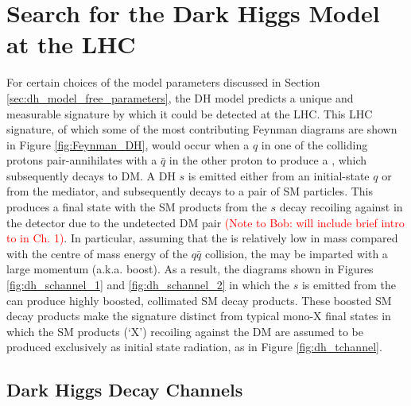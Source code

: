 \section{Search for the Dark Higgs Model at the LHC}
\label{sec:dh_search_lhc}

For certain choices of the model parameters discussed in Section \ref{sec:dh_model_free_parameters}, the DH model predicts a unique and measurable signature by which it could be detected at the LHC. This LHC signature, of which some of the most contributing Feynman diagrams are shown in Figure \ref{fig:Feynman_DH}, would occur when a \(q\) in one of the colliding protons pair-annihilates with a \(\bar{q}\) in the other proton to produce a \Zprime, which subsequently decays to DM. A DH \(s\) is emitted either from an initial-state \(q\) or from the \Zprime mediator, and subsequently decays to a pair of SM particles. This produces a final state with the SM products from the \(s\) decay recoiling against \met in the detector due to the undetected DM pair \textcolor{red}{(Note to Bob: will include brief intro to \met in Ch. 1)}. In particular, assuming that the \Zprime is relatively low in mass compared with the centre of mass energy of the \(q\bar{q}\) collision, the \Zprime may be imparted with a large momentum (a.k.a. boost). As a result, the diagrams shown in Figures \ref{fig:dh_schannel_1} and \ref{fig:dh_schannel_2} in which the \(s\) is emitted from the \Zprime can produce highly boosted, collimated SM decay products. These boosted SM decay products make the signature distinct from typical mono-X final states in which the SM products (`X') recoiling against the DM are assumed to be produced exclusively as initial state radiation, as in Figure \ref{fig:dh_tchannel}.

\subsection{Dark Higgs Decay Channels}

